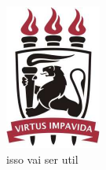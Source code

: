 \begin{figure}[ht]
\begin{center}
\includegraphics{./ufpelogo.pdf}
\end{center}
\caption[Uma figura com legenda grande.]{isso vai ser util}\label{fig_exe}
\end{figure}
